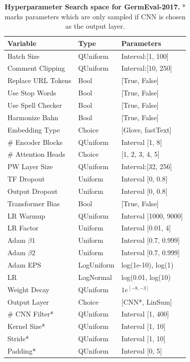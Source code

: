 \begin{table}[H]
	\centering
	\begin{tabular}{@{}lll@{}}
	\toprule
	Variable           & Type       & Parameters                \\ \midrule
	Batch Size         & QUniform   & Interval:{[}1, 100{]}    \\
	Comment Clipping   & QUniform   & Interval:{[}10, 250{]}   \\
	Replace URL Tokens & Bool       & {[}True, False{]}         \\
	Use Stop Words     & Bool       & {[}True, False{]}         \\
	Use Spell Checker  & Bool       & {[}True, False{]}         \\
	Harmonize Bahn     & Bool       & {[}True, False{]}         \\
	Embedding Type     & Choice     & {[}Glove, fastText{]}     \\
	\# Encoder Blocks  & QUniform   & Interval {[}1, 8{]}       \\
	\# Attention Heads & Choice     & {[}1, 2, 3, 4, 5{]}       \\
	PW Layer Size      & QUniform   & Interval:{[}32, 256{]}   \\
	TF Dropout         & Uniform    & Interval {[}0, 0.8{]}     \\
	Output Dropout     & Uniform    & Interval {[}0, 0.8{]}     \\
	Transformer Bias   & Bool       & {[}True, False{]}         \\
	LR Warmup          & QUniform   & Interval {[}1000, 9000{]} \\
	LR Factor          & Uniform    & Interval {[}0.01, 4{]}    \\
	Adam $\beta 1$        & Uniform    & Interval {[}0.7, 0.999{]} \\
	Adam $\beta 2$        & Uniform    & Interval {[}0.7, 0.999{]} \\
	Adam EPS           & LogUniform & log(1e-10), log(1)        \\
	LR                 & LogNormal  & log(0.01, log(10)         \\
	Weight Decay       & QUniform   & $1e^{[-8, -3]}$       \\
	Output Layer       & Choice     & {[}CNN*, LinSum{]}        \\
	\# CNN Filter*     & QUniform   & Interval {[}1, 400{]}     \\
	Kernel Size*       & QUniform   & Interval {[}1, 10{]}      \\
	Stride*            & QUniform   & Interval {[}1, 10{]}      \\
	Padding*           & QUniform   & Interval {[}0, 5{]}       \\ \bottomrule
	\end{tabular}
	\caption{\textbf{Hyperparameter Search space for GermEval-2017.} * marks parameters which are only sampled if CNN is chosen as the output layer.}
	\label{tab:08_hpSpace}	
\end{table}

